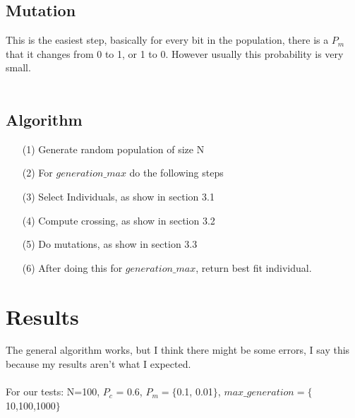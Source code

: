 \documentclass[a4paper]{article}
\begin{document}
\subsection{Mutation}
This is the easiest step, basically for every bit in the population, there is a $P_m$ that it changes from 0 to 1, or 1 to 0. However usually this probability is very small.\\\\


\subsection{Algorithm}
\begin{itemize}
\item[(1)] Generate random population of size N
\item[(2)] For $generation\_max$ do the following steps
\item[(3)] Select Individuals, as show in section 3.1
\item[(4)] Compute crossing, as show in section 3.2 
\item[(5)] Do mutations, as show in section 3.3
\item[(6)] After doing this for $generation\_max$, return best fit individual.
\end{itemize}
\newpage
\section{Results}
The general algorithm works, but I think there might be some errors, I say this because my results aren't what I expected.\\\\
For our tests: N=100, $P_c$ = 0.6, $P_m = \{$0.1, 0.01$\}$, $max\_generation = \{$10,100,1000$\}$
\end{document}
